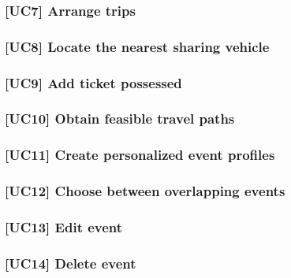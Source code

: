 	\subsubsection{[UC7] Arrange trips}
			
		
	\subsubsection{[UC8] Locate the nearest sharing vehicle}
			
		
	\subsubsection{[UC9] Add ticket possessed}
			
	
	\subsubsection{[UC10] Obtain feasible travel paths}
			
	
	\subsubsection{[UC11] Create personalized event profiles}
		
	
	\subsubsection{[UC12] Choose between overlapping events}
		
		
	\subsubsection{[UC13] Edit event}
	
		
	\subsubsection{[UC14] Delete event}
	
		
